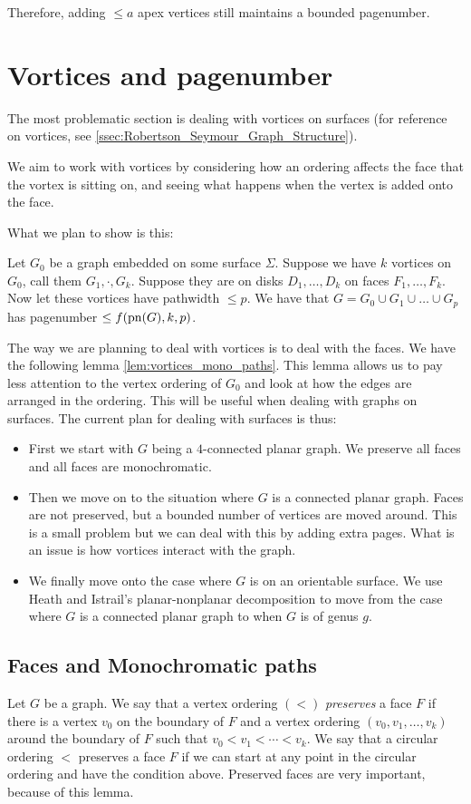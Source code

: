 Therefore, adding \( \leq a\) apex vertices still maintains a bounded pagenumber.

\section{Vortices and pagenumber}
The most problematic section is dealing with vortices on surfaces (for reference on vortices, see \cref{ssec:Robertson_Seymour_Graph_Structure}).

We aim to work with vortices by considering how an ordering affects the face that the vortex is sitting on, and seeing what happens when the vertex is added onto the face.

What we plan to show is this:
\begin{conjecture}
	Let \(G_0\) be a graph embedded on some surface \(\Sigma\). Suppose we have \(k\) vortices on \(G_0\), call them \(G_1, \cdot , G_k\). Suppose they are on disks \(D_1, \ldots, D_k\) on faces \(F_1, \ldots, F_k\). Now let these vortices have pathwidth \(\leq p\). 
	We have that \(G = G_0 \cup G_1 \cup \ldots \cup G_p\) has pagenumber \(\leq f(\operatorname{pn}(G), k, p)\).
\end{conjecture}
The way we are planning to deal with vortices is to deal with the faces. We have the following lemma \cref{lem:vortices_mono_paths}. This lemma allows us to pay less attention to the vertex ordering of \(G_0\) and look at how the edges are arranged in the ordering. This will be useful when dealing with graphs on surfaces.
The current plan for dealing with surfaces is thus:
\begin{itemize}
	\item First we start with \(G\) being a \(4\)-connected planar graph. We preserve all faces and all faces are monochromatic.
	\item Then we move on to the situation where \(G\) is a connected planar graph. Faces are not preserved, but a bounded number of vertices are moved around. This is a small problem but we can deal with this by adding extra pages. What is an issue is how vortices interact with the graph. 
	\item We finally move onto the case where \(G\) is on an orientable surface. We use Heath and Istrail's \cite{heathPagenumberGenusGraphs1992} planar-nonplanar decomposition to move from the case where \(G\) is a connected planar graph to when \(G\) is of genus \(g\). 
\end{itemize}

\subsection{Faces and Monochromatic paths}
Let \(G\) be a graph. We say that a vertex ordering \((<)\) \textit{preserves} a face \(F\) if there is a vertex \(v_0\) on the boundary of \(F\) and a vertex ordering \((v_0, v_1, \ldots, v_k)\) around the boundary of \(F\) such that \(v_0 < v_1 < \cdots < v_k\). We say that a circular ordering \(<\) preserves a face \(F\) if we can start at any point in the circular ordering and have the condition above. 
Preserved faces are very important, because of this lemma.

